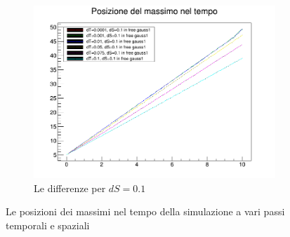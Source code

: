 \begin{figure}[hbt]
\begin{subfigure}[b]{0.3\textwidth}
		\includegraphics[width=\textwidth]{IMG/v_g1_01}
		\caption[Differenze in 0.1]{Le differenze per $dS = 0.1$}
	\end{subfigure}
	\caption{Le posizioni dei massimi nel tempo della simulazione a vari passi temporali  e spaziali}\label{fig:velocita}
\end{figure}

